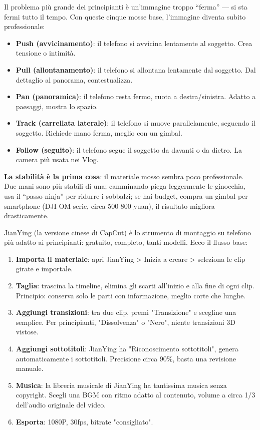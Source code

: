 
Il problema più grande dei principianti è un'immagine troppo “ferma” — si sta fermi tutto il tempo. Con queste cinque mosse base, l'immagine diventa subito professionale:

\begin{itemize}
  \item \textbf{Push (avvicinamento)}: il telefono si avvicina lentamente al soggetto. Crea tensione o intimità.
  \item \textbf{Pull (allontanamento)}: il telefono si allontana lentamente dal soggetto. Dal dettaglio al panorama, contestualizza.
  \item \textbf{Pan (panoramica)}: il telefono resta fermo, ruota a destra/sinistra. Adatto a paesaggi, mostra lo spazio.
  \item \textbf{Track (carrellata laterale)}: il telefono si muove parallelamente, seguendo il soggetto. Richiede mano ferma, meglio con un gimbal.
  \item \textbf{Follow (seguito)}: il telefono segue il soggetto da davanti o da dietro. La camera più usata nei Vlog.
\end{itemize}

\textbf{La stabilità è la prima cosa}: il materiale mosso sembra poco professionale. Due mani sono più stabili di una; camminando piega leggermente le ginocchia, usa il “passo ninja” per ridurre i sobbalzi; se hai budget, compra un gimbal per smartphone (DJI OM serie, circa 500-800 yuan), il risultato migliora drasticamente.


JianYing (la versione cinese di CapCut) è lo strumento di montaggio su telefono più adatto ai principianti: gratuito, completo, tanti modelli. Ecco il flusso base:

\begin{enumerate}
  \item \textbf{Importa il materiale}: apri JianYing > Inizia a creare > seleziona le clip girate e importale.
  \item \textbf{Taglia}: trascina la timeline, elimina gli scarti all'inizio e alla fine di ogni clip. Principio: conserva solo le parti con informazione, meglio corte che lunghe.
  \item \textbf{Aggiungi transizioni}: tra due clip, premi "Transizione" e scegline una semplice. Per principianti, "Dissolvenza" o "Nero", niente transizioni 3D vistose.
  \item \textbf{Aggiungi sottotitoli}: JianYing ha "Riconoscimento sottotitoli", genera automaticamente i sottotitoli. Precisione circa 90\%, basta una revisione manuale.
  \item \textbf{Musica}: la libreria musicale di JianYing ha tantissima musica senza copyright. Scegli una BGM con ritmo adatto al contenuto, volume a circa 1/3 dell'audio originale del video.
  \item \textbf{Esporta}: 1080P, 30fps, bitrate "consigliato".
\end{enumerate}

